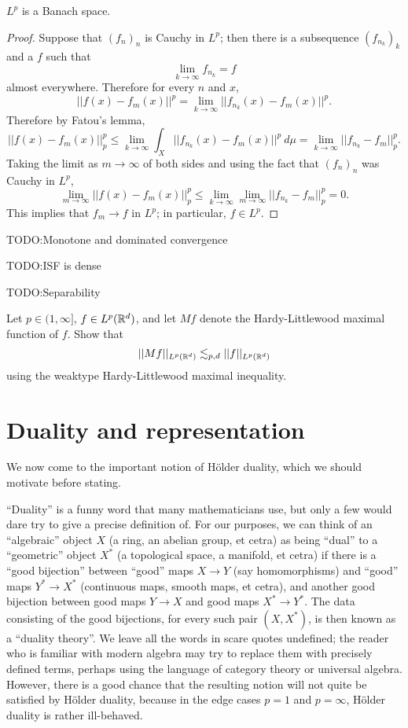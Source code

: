 \begin{theorem}
$L^{p}$ is a Banach space.
\end{theorem}
\begin{proof}
Suppose that ${(f_{n})}_{n}$ is Cauchy in $L^{p}$; then there is a subsequence ${(f_{n_{k}})}_{k}$ and a $f$ such that
\[\lim_{k \to \infty} f_{n_{k}} = f\]
almost everywhere. Therefore for every $n$ and $x$,
\[||f(x) - f_{m}(x)||^{p} = \lim_{k \to \infty} ||f_{n_{k}}(x) - f_{m}(x)||^{p}.\]
Therefore by Fatou's lemma,
\[||f(x) - f_{m}(x)||_{p} ^{p} \leq \lim_{k \to \infty} \int_{X} ||f_{n_{k}}(x) - f_{m}(x)||^{p}~d\mu = \lim_{k \to \infty} ||f_{n_{k}} - f_{m}||_{p} ^{p}.\]
Taking the limit as $m \to \infty$ of both sides and using the fact that ${(f_{n})}_{n}$ was Cauchy in $L^{p}$,
\[\lim_{m \to \infty} ||f(x) - f_{m}(x)||_{p} ^{p} \leq \lim_{k \to \infty} \lim_{m \to \infty} ||f_{n_{k}} - f_{m}||_{p} ^{p} = 0.\]
This implies that $f_{m} \to f$ in $L^{p}$; in particular, $f \in L^{p}$.
\end{proof}

TODO:\@ Monotone and dominated convergence

TODO:\@ ISF is dense

TODO:\@ Separability

\begin{exercise}
Let $p \in (1, \infty]$, $f \in L^{p}(\mathbb{R}^{d})$, and let $Mf$ denote the Hardy-Littlewood maximal function of $f$.
Show that
\[||Mf||_{L^{p}(\mathbb{R}^{d})} \lesssim_{p,d} ||f||_{L^{p}(\mathbb{R}^{d})}\]
using the weaktype Hardy-Littlewood maximal inequality.
\end{exercise}

\section{Duality and representation}
We now come to the important notion of H\"older duality, which we should motivate before stating.

``Duality'' is a funny word that many mathematicians use, but only a few would dare try to give a precise definition of.
For our purposes, we can think of an ``algebraic'' object $X$ (a ring, an abelian group, et cetra) as being ``dual'' to a ``geometric'' object $X^{*}$ (a topological space, a manifold, et cetra) if there is a ``good bijection'' between ``good'' maps $X \to Y$ (say homomorphisms) and ``good'' maps $Y^{*} \to X^{*}$ (continuous maps, smooth maps, et cetra), and another good bijection between good maps $Y \to X$ and good maps $X^{*} \to Y^{*}$.
The data consisting of the good bijections, for every such pair $(X, X^{*})$, is then known as a ``duality theory''.
We leave all the words in scare quotes undefined; the reader who is familiar with modern algebra may try to replace them with precisely defined terms, perhaps using the language of category theory or universal algebra.
However, there is a good chance that the resulting notion will not quite be satisfied by H\"older duality, because in the edge cases $p = 1$ and $p = \infty$, H\"older duality is rather ill-behaved.

